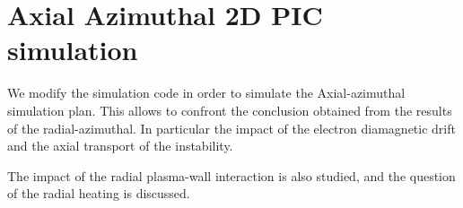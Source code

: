 



\chapter{Axial Azimuthal 2D PIC simulation}
\label{ch-6}


\begin{Chabstract}
  We modify the simulation code \LPPic in order to simulate the Axial-azimuthal simulation plan.
  This allows to confront the conclusion obtained from the results of the radial-azimuthal.
  In particular the impact of the electron diamagnetic drift and the axial transport of the instability.
  
  The impact of the radial plasma-wall interaction is also studied, and the question of the radial heating is discussed. 
\end{Chabstract}
\renewcommand\subfigurewidth{3in}

% 
% 

\minitoc








